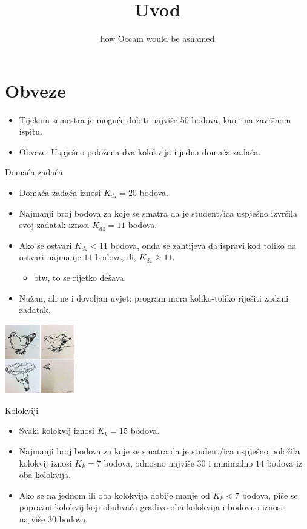 \documentclass[9pt]{beamer}
\title{Uvod}
\subtitle{how Occam would be ashamed}
\institute{Računalna grafika}
\begin{document}
\begin{frame}
 \titlepage
\end{frame}

\section{Obveze}
\begin{frame}
	\begin{itemize}
		\item Tijekom semestra je moguće dobiti najviše 50 bodova, kao i na završnom ispitu.
		\item Obveze: Uspješno položena dva kolokvija i jedna domaća zadaća.
	\end{itemize}
\end{frame}
\begin{frame}{Domaća zadaća}
	\begin{itemize}
		\item Domaća zadaća iznosi $K_{dz} = 20$ bodova. 
		\item Najmanji broj bodova za koje se smatra da je student/ica uspješno izvršila svoj zadatak iznosi $K_{dz} = 11$ bodova. 
		\item Ako se ostvari $K_{dz}<11$ bodova, onda se zahtijeva da ispravi kod toliko da ostvari najmanje $11$ bodova, ili, $K_{dz}\ge 11 $. 
		\begin{itemize}
			\item btw, to se rijetko dešava.
		\end{itemize}
		\item Nužan, ali ne i dovoljan uvjet: program mora koliko-toliko riješiti zadani zadatak.
	\end{itemize}
\begin{center}
	\includegraphics[height=3cm]{./slike/programming_meme_bird.png}
\end{center}
\end{frame}
\begin{frame}{Kolokviji}
	\begin{itemize}
		\item Svaki kolokvij iznosi $K_k = 15$ bodova. 
		\item Najmanji broj bodova za koje se smatra da je student/ica uspješno položila kolokvij iznosi $K_k = 7$ bodova, odnosno najviše $30$ i minimalno $14$ bodova iz oba kolokvija.
		\item Ako se na jednom ili oba kolokvija dobije manje od $K_k < 7$ bodova, piše se popravni kolokvij koji obuhvaća gradivo oba kolokvija i bodovno iznosi najviše $30$ bodova.
	\end{itemize}
\end{frame}
\end{document}
